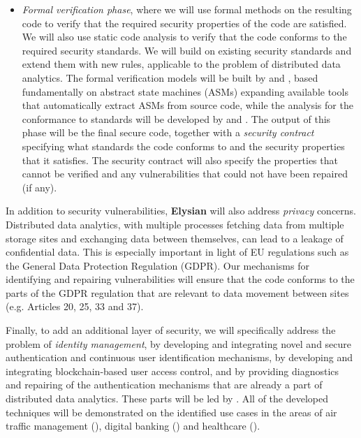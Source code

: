 \documentclass[a4paper,11pt]{article}
\newcommand{\project}[1]{\textbf{#1}\xspace}
\newcommand{\SECURITY}{\project{Elysian}}
\newcommand{\TheProject}{\SECURITY}
\begin{document}
\begin{itemize}
\item \emph{Formal verification phase}, where we will use formal methods on the resulting code to verify that the required security properties of the code are satisfied. We will also use static code analysis to verify that the code conforms to the required security standards. We will build on existing security standards 
and extend them with new rules, applicable to the problem of distributed data analytics. The formal verification models will be built by \SCCHshort{} and \SAshort{}, based fundamentally on abstract state machines (ASMs) expanding available tools that automatically extract ASMs from source code, while the analysis for the conformance to standards will be developed by \UCMshort{} and \YAGshort{}. The output of this phase will be the final secure code, together with a \emph{security contract} specifying what standards the code conforms to and the security properties that it satisfies. The security contract will also specify the properties that cannot be verified and any vulnerabilities that could not have been repaired (if any).
\end{itemize}

In addition to security vulnerabilities, \TheProject{} will also address \emph{privacy} concerns. Distributed data analytics, with multiple processes %
fetching data from multiple storage sites and exchanging data between themselves, can lead to a leakage of confidential data. This is especially important in light of EU regulations such as the General Data Protection Regulation (GDPR). Our mechanisms for identifying and repairing vulnerabilities will ensure that the %
code conforms to the parts of the GDPR regulation that are relevant to data movement between sites (e.g. Articles 20, 25, 33 and 37). 

Finally, to add an additional layer of security, we will specifically address the problem of \emph{identity management}, by developing and integrating novel and secure authentication and continuous user identification mechanisms, by developing and integrating blockchain-based user access control, and by providing diagnostics and repairing of the authentication mechanisms that are already a part of distributed data analytics. These parts will be led by \COGNIshort{}. All of the developed techniques will be demonstrated on the identified use cases in the areas of air traffic management (\FRQshort{}), digital banking (\SOPRAshort{}) and healthcare (\SOPRAshort{}). 
\end{document}
